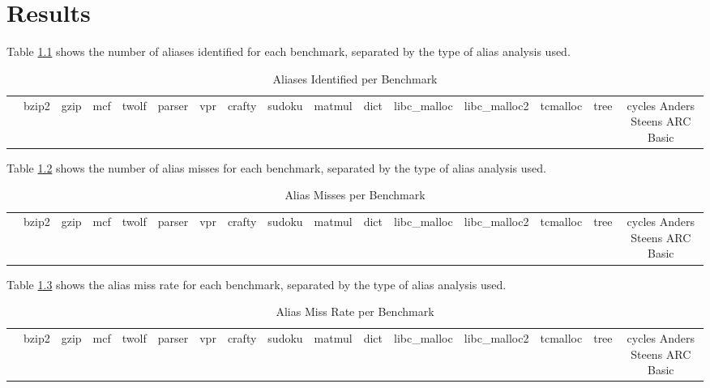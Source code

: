 \chapter{Results}

Table \ref{table:1} shows the number of aliases identified for each benchmark, separated by the type of alias analysis used.

\begin{table}
\centering
   \begin{tabular} {|c|c c c c c c c c c c c c c c c|}
      \hline
      & bzip2 & gzip & mcf & twolf & parser & vpr & crafty & sudoku & matmul & dict & libc_malloc & libc_malloc2 & tcmalloc & tree & cycles
      \hline
      Anders
      \hline
      Steens
      \hline
      ARC
      \hline
      Basic
      \hline
   \end{tabular}
   \caption{Aliases Identified per Benchmark}
   \label{table:1}
\end{table}

Table \ref{table:2} shows the number of alias misses for each benchmark, separated by the type of alias analysis used.

\begin{table}
\centering
   \begin{tabular} {|c|c c c c c c c c c c c c c c c|}
      \hline
      & bzip2 & gzip & mcf & twolf & parser & vpr & crafty & sudoku & matmul & dict & libc_malloc & libc_malloc2 & tcmalloc & tree & cycles
      \hline
      Anders
      \hline
      Steens
      \hline
      ARC
      \hline
      Basic
      \hline
   \end{tabular}
   \caption{Alias Misses per Benchmark}
   \label{table:2}
\end{table}

Table \ref{table:3} shows the alias miss rate for each benchmark, separated by the type of alias analysis used.

\begin{table}
\centering
   \begin{tabular} {|c|c c c c c c c c c c c c c c c|}
      \hline
      & bzip2 & gzip & mcf & twolf & parser & vpr & crafty & sudoku & matmul & dict & libc_malloc & libc_malloc2 & tcmalloc & tree & cycles
      \hline
      Anders
      \hline
      Steens
      \hline
      ARC
      \hline
      Basic
      \hline
   \end{tabular}
   \caption{Alias Miss Rate per Benchmark}
   \label{table:3}
\end{table}


